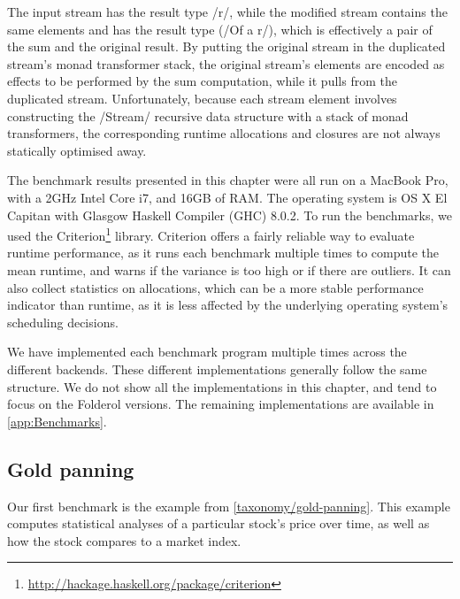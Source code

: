 The input stream has the result type \Hs/r/, while the modified stream contains the same elements and has the result type (\Hs/Of a r/), which is effectively a pair of the sum and the original result.
By putting the original stream in the duplicated stream's monad transformer stack, the original stream's elements are encoded as effects to be performed by the sum computation, while it pulls from the duplicated stream.
Unfortunately, because each stream element involves constructing the \Hs/Stream/ recursive data structure with a stack of monad transformers, the corresponding runtime allocations and closures are not always statically optimised away.

The benchmark results presented in this chapter were all run on a MacBook Pro, with a 2GHz Intel Core i7, and 16GB of RAM.
The operating system is OS X El Capitan with Glasgow Haskell Compiler (GHC) 8.0.2.
To run the benchmarks, we used the Criterion\footnote{\url{http://hackage.haskell.org/package/criterion}} library.
Criterion offers a fairly reliable way to evaluate runtime performance, as it runs each benchmark multiple times to compute the mean runtime, and warns if the variance is too high or if there are outliers.
It can also collect statistics on allocations, which can be a more stable performance indicator than runtime, as it is less affected by the underlying operating system's scheduling decisions.

We have implemented each benchmark program multiple times across the different backends.
These different implementations generally follow the same structure.
We do not show all the implementations in this chapter, and tend to focus on the Folderol versions.
The remaining implementations are available in \cref{app:Benchmarks}.

\subsection{Gold panning}

Our first benchmark is the \Hs@priceAnalyses@ example from \cref{taxonomy/gold-panning}.
This example computes statistical analyses of a particular stock's price over time, as well as how the stock compares to a market index.


